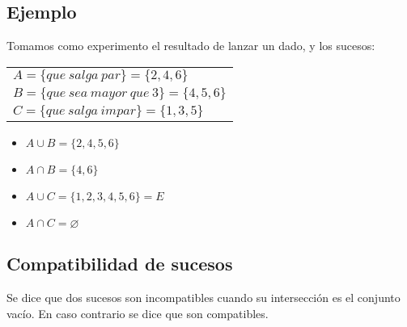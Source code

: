 \subsection{Ejemplo} Tomamos como experimento el resultado de lanzar un dado, y los sucesos: \\
\begin{tabular}{l}
$A=\lbrace que\ salga\ par\rbrace=\lbrace2,4,6\rbrace$ \\
$B=\lbrace que\ sea\ mayor\ que\ 3\rbrace=\lbrace4,5,6\rbrace$ \\
$C=\lbrace que\ salga\ impar\rbrace=\lbrace1,3,5\rbrace$
\end{tabular}
\begin{itemize}	
	\item $A\cup B=\lbrace2,4,5,6\rbrace$ \\
%    


	\item $A\cap B=\lbrace4,6\rbrace$\\



\item $A\cup C=\lbrace1,2,3,4,5,6\rbrace=E$
\item $A\cap C=\varnothing$
\end{itemize}

\subsection{Compatibilidad de sucesos} Se dice que dos sucesos son incompatibles cuando su intersección es el conjunto vacío. En caso contrario se dice que son compatibles.

